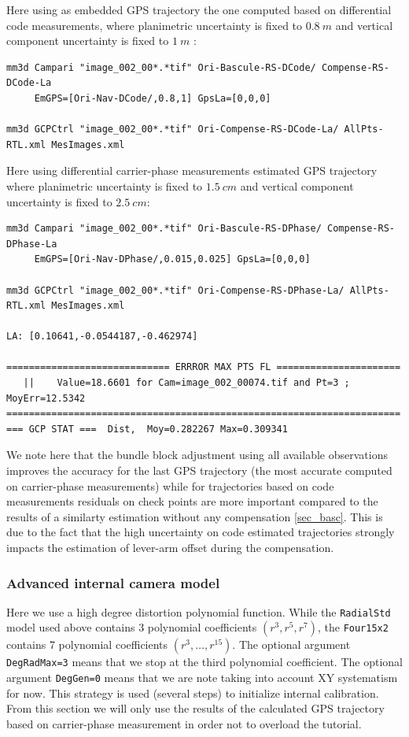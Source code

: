 Here using as embedded GPS trajectory the one computed based on differential code measurements, where planimetric uncertainty is fixed to $0.8\ m$ and vertical component uncertainty is fixed to $1\ m$ :

\begin{verbatim}
mm3d Campari "image_002_00*.*tif" Ori-Bascule-RS-DCode/ Compense-RS-DCode-La 
     EmGPS=[Ori-Nav-DCode/,0.8,1] GpsLa=[0,0,0]
     
mm3d GCPCtrl "image_002_00*.*tif" Ori-Compense-RS-DCode-La/ AllPts-RTL.xml MesImages.xml
\end{verbatim}

Here using differential carrier-phase measurements estimated GPS trajectory where planimetric uncertainty is fixed to $1.5\ cm$ and vertical component uncertainty is fixed to $2.5\ cm$:
\begin{verbatim}
mm3d Campari "image_002_00*.*tif" Ori-Bascule-RS-DPhase/ Compense-RS-DPhase-La 
     EmGPS=[Ori-Nav-DPhase/,0.015,0.025] GpsLa=[0,0,0]
     
mm3d GCPCtrl "image_002_00*.*tif" Ori-Compense-RS-DPhase-La/ AllPts-RTL.xml MesImages.xml

LA: [0.10641,-0.0544187,-0.462974]

============================= ERRROR MAX PTS FL ======================
   ||    Value=18.6601 for Cam=image_002_00074.tif and Pt=3 ; MoyErr=12.5342
======================================================================
=== GCP STAT ===  Dist,  Moy=0.282267 Max=0.309341
\end{verbatim}



We note here that the bundle block adjustment using all available observations improves the accuracy for the last GPS trajectory (the most accurate computed on carrier-phase measurements) while for trajectories based on code measurements residuals on check points are more important compared to the results of a similarty estimation without any compensation \ref{sec_basc}. This is due to the fact that the high uncertainty on code estimated trajectories strongly impacts the estimation of lever-arm offset during the compensation.
\subsubsection{Advanced internal camera model}
Here we use a high degree distortion polynomial function. While the {\tt RadialStd} model used above contains 3 polynomial coefficients $(r^{3}, r^{5}, r^{7})$, the {\tt Four15x2} contains 7 polynomial coefficients $(r^{3}, \dots, r^{15})$. The optional argument {\tt DegRadMax=3} means that we stop at the third polynomial coefficient. The optional argument {\tt DegGen=0} means that we are note taking into account XY systematism for now. This strategy is used (several steps) to initialize internal calibration. From this section we will only use the results of the calculated GPS trajectory based on carrier-phase measurement in order not to overload the tutorial.

